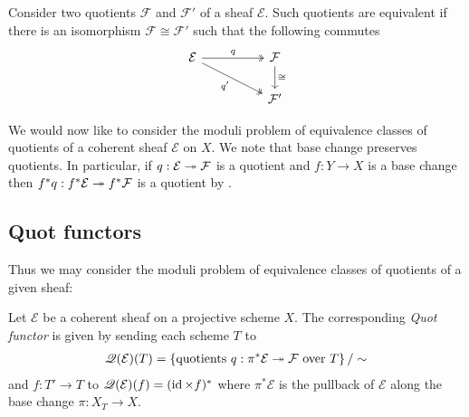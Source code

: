 \documentclass[12pt]{ociamthesis}  %
\begin{document}
Consider two quotients $\mathcal F$ and $\mathcal F'$ of a
sheaf $\mathcal E$.
Such quotients are equivalent if there is an isomorphism
$\mathcal F\cong\mathcal F'$ such that the following commutes
\begin{equation}\label{eq:quotient_equivalence}
  \begin{tikzcd}
    {\mathcal E} && {\mathcal F} \\
                 && {\mathcal F'}
                 \arrow["q", two heads, from=1-1, to=1-3]
                 \arrow["{q'}"', two heads, from=1-1, to=2-3]
                 \arrow["\cong", from=1-3, to=2-3]
  \end{tikzcd}
\end{equation}

We would now like to consider the moduli problem of equivalence
classes of quotients of a coherent sheaf $\mathcal E$ on $X$.
We note that base change preserves quotients. In particular,
if $q : \mathcal E \twoheadrightarrow \mathcal F$ is a quotient and
$f : Y \to X$ is a base change then
$f^*q : f^*\mathcal E \twoheadrightarrow f^*\mathcal F$ is a quotient
by \cite[\href{https://stacks.math.columbia.edu/tag/01U9}{Tag 01U9}]{stacks-project}.

\subsection{Quot functors}

Thus we may consider the moduli problem of equivalence classes of
quotients of a given sheaf:

\begin{definition}\missingcitation
  Let $\mathcal E$ be a coherent sheaf on a projective scheme $X$.
  The corresponding \emph{Quot functor} is given by sending each
  scheme $T$ to
  \begin{align*}
    \mathscr Q(\mathcal E)(T) = \left\lbrace{
        \text{quotients $q : \pi^*\mathcal E \twoheadrightarrow \mathcal F$
        over $T$}
    }\right\rbrace / \sim
  \end{align*}
  and $f : T' \to T$ to
  $\mathscr Q(\mathcal E)(f) = (\operatorname{id} \times f)^*$ where
  $\pi^*\mathcal E$ is the pullback of $\mathcal E$ along
  the base change $\pi:X_T\to X$.
\end{definition}
\end{document}
